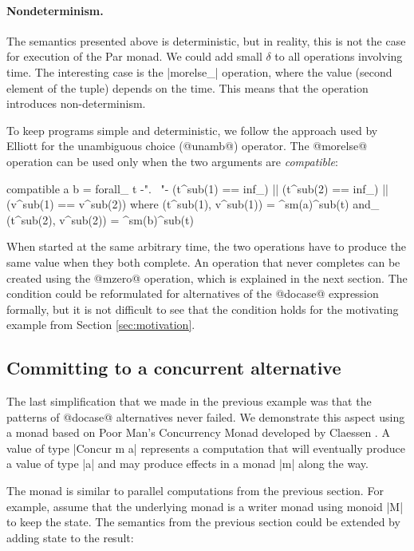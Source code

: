 \documentclass[preprint]{sigplanconf}
\begin{document}
\paragraph{Nondeterminism.} The semantics presented above is deterministic, but in reality, this 
is not the case for execution of the Par monad. We could add small $\delta$ to all operations involving time. The interesting 
case is the |morelse_| operation, where the value (second element of the tuple) depends on the time.
This means that the operation introduces non-determinism.

To keep programs simple and deterministic, we follow the approach used by Elliott \cite{push-pull-frp} 
for the unambiguous choice (@unamb@) operator. The @morelse@ operation can be used only when the 
two arguments are \textit{compatible}:

\begin{code}
compatible a b = forall_ t {-". \ "-} (t^sub(1) == inf_) || (t^sub(2) == inf_) || (v^sub(1) == v^sub(2))
	where  (t^sub(1), v^sub(1)) = ^sm(a)^sub(t) and_ (t^sub(2), v^sub(2)) = ^sm(b)^sub(t)
\end{code}
When started at the same arbitrary time, the two operations have to produce the same value when they
both complete. An operation that never completes can be created using the @mzero@ operation, which 
is explained in the next section. The condition could be reformulated for alternatives of the @docase@
expression formally, but it is not difficult to see that the condition holds for the motivating 
example from Section \ref{sec:motivation}.


\subsection{Committing to a concurrent alternative}
\label{sec:intro-commit-poorman}

The last simplification that we made in the previous example was that the patterns of @docase@
alternatives never failed. We demonstrate this aspect using a monad based on Poor Man's Concurrency 
Monad developed by Claessen \cite{poorman}. A value of type |Concur m a| represents a computation 
that will eventually produce a value of type |a| and may produce effects in a monad |m| along the way. 

The monad is similar to parallel computations from the previous section. For example, assume
that the underlying monad is a writer monad using monoid |M| to keep the state. The semantics from 
the previous section could be extended by adding state to the result:
\end{document}
